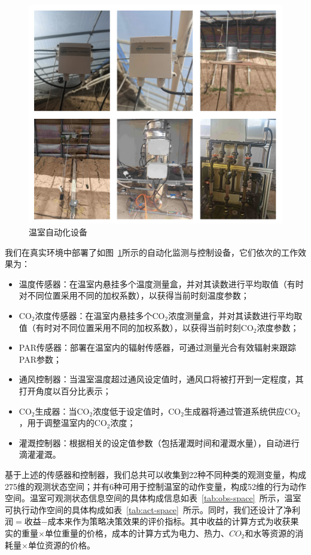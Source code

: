 \begin{figure}
\centering
\includegraphics[width=\textwidth]{figures/devices.png}
\caption{温室自动化设备}
\label{fig:devices}
\end{figure}

我们在真实环境中部署了如图~\ref{fig:devices}所示的自动化监测与控制设备，它们依次的工作效果为：

\begin{itemize}
    \item 温度传感器：在温室内悬挂多个温度测量盒，并对其读数进行平均取值（有时对不同位置采用不同的加权系数），以获得当前时刻温度参数；
    \item CO$_2$浓度传感器：在温室内悬挂多个CO$_2$浓度测量盒，并对其读数进行平均取值（有时对不同位置采用不同的加权系数），以获得当前时刻CO$_2$浓度参数；
    \item PAR传感器：部署在温室内的辐射传感器，可通过测量光合有效辐射来跟踪PAR参数；
    \item 通风控制器：当温室温度超过通风设定值时，通风口将被打开到一定程度，其打开角度以百分比表示；
    \item CO$_2$生成器：当CO$_2$浓度低于设定值时，CO$_2$生成器将通过管道系统供应CO$_2$，用于调整温室内的CO$_2$浓度；
    \item 灌溉控制器：根据相关的设定值参数（包括灌溉时间和灌溉水量），自动进行滴灌灌溉。
\end{itemize}

基于上述的传感器和控制器，我们总共可以收集到22种不同种类的观测变量，构成275维的观测状态空间；并有6种可用于控制温室的动作变量，构成52维的行为动作空间。温室可观测状态信息空间的具体构成信息如表~\ref{tab:obs-space}~所示，温室可执行动作空间的具体构成如表~\ref{tab:act-space}~所示。同时，我们还设计了净利润$=$收益$-$成本来作为策略决策效果的评价指标。其中收益的计算方式为收获果实的重量$\times$单位重量的价格，成本的计算方式为电力、热力、$CO_2$和水等资源的消耗量$\times$单位资源的价格。

